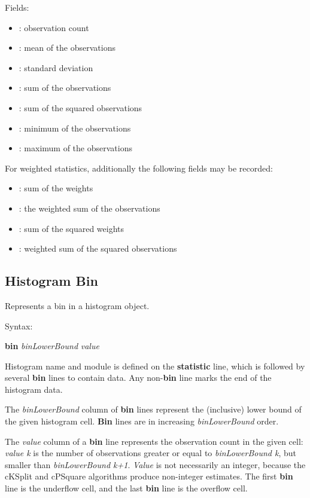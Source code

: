 Fields:

\begin{itemize}
    \item {}: observation count
    \item {}: mean of the observations
    \item {}: standard deviation
    \item {}: sum of the observations
    \item {}: sum of the squared observations
    \item {}: minimum of the observations
    \item {}: maximum of the observations
\end{itemize}

For weighted statistics, additionally the following fields may be recorded:

\begin{itemize}
    \item {}: sum of the weights
    \item {}: the weighted sum of the observations
    \item {}:  sum of the squared weights
    \item {}: weighted sum of the squared observations
\end{itemize}


\subsection{Histogram Bin}
\label{sec:result-file-formats:opp:histogram-bin}

Represents a bin in a histogram object.

Syntax:

\hspace{20mm} \textbf{bin} \textit{binLowerBound} \textit{value}

Histogram name and module is defined on the \textbf{statistic} line,
which is followed by several \textbf{bin} lines to contain data. Any
non{}-\textbf{bin} line marks the end of the histogram data.

The \textit{binLowerBound} column of \textbf{bin} lines represent the
(inclusive) lower bound of the given histogram cell. \textbf{Bin} lines are in
increasing \textit{binLowerBound} order.

The \textit{value} column of a \textbf{bin} line represents the observation
count in the given cell: \textit{value k} is the number of observations
greater or equal to \textit{binLowerBound k}, but smaller than
\textit{binLowerBound k+1}. \textit{Value} is not necessarily an
integer, because the cKSplit and cPSquare algorithms produce
non{}-integer estimates. The first \textbf{bin} line is the underflow
cell, and the last \textbf{bin} line is the overflow cell.

